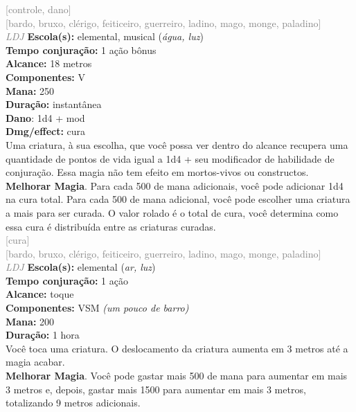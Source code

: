 \documentclass{RPG_Adventure}[2021/10/20]
\begin{document}
{\scriptsize \textcolor{gray}{[controle, dano]\\}}
{\scriptsize \textcolor{gray}{[bardo, bruxo, clérigo, feiticeiro, guerreiro, ladino, mago, monge, paladino]\\}}
{\tiny \textcolor{gray}{\textit{LDJ}}}\jump{}
{\small \t \textbf{Escola(s):} elemental, musical (\textit{água, luz})\\\t \textbf{Tempo conjuração:} 1 ação bônus\\\t \textbf{Alcance:} 18 metros\\\t \textbf{Componentes:} V\\\t \textbf{Mana:} 250\\\t \textbf{Duração:} instantânea\\\t \textbf{Dano}: 1d4 + mod\\\t \textbf{Dmg/effect:} cura\\}
{\normalsize Uma criatura, à sua escolha, que você possa ver dentro do alcance recupera uma quantidade de pontos de vida igual a 1d4 + seu modificador de habilidade de conjuração. Essa magia não tem efeito em mortos-vivos ou constructos.\\\t \textbf{Melhorar Magia}. Para cada 500 de mana adicionais, você pode adicionar 1d4 na cura total. Para cada 500 de mana adicional, você pode escolher uma criatura a mais para ser curada. O valor rolado é o total de cura, você determina como essa cura é distribuída entre as criaturas curadas.\\}
{\scriptsize \textcolor{gray}{[cura]\\}}
{\scriptsize \textcolor{gray}{[bardo, bruxo, clérigo, feiticeiro, guerreiro, ladino, mago, monge, paladino]\\}}
{\tiny \textcolor{gray}{\textit{LDJ}}}\jump{}
{\small \t \textbf{Escola(s):} elemental (\textit{ar, luz})\\\t \textbf{Tempo conjuração:} 1 ação\\\t \textbf{Alcance:} toque\\\t \textbf{Componentes:} VSM \textit{(um pouco de barro)}\\\t \textbf{Mana:} 200\\\t \textbf{Duração:} 1 hora\\}
{\normalsize Você toca uma criatura. O deslocamento da criatura aumenta em 3 metros até a magia acabar.\\\t \textbf{Melhorar Magia}. Você pode gastar mais 500 de mana para aumentar em mais 3 metros e, depois, gastar mais 1500 para aumentar em mais 3 metros, totalizando 9 metros adicionais.\\}
\end{document}
